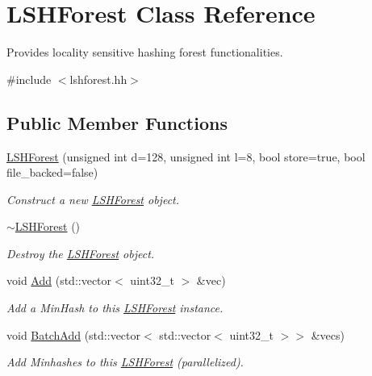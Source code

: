 \hypertarget{classLSHForest}{}\section{L\+S\+H\+Forest Class Reference}
\label{classLSHForest}


Provides locality sensitive hashing forest functionalities.  




{\ttfamily \#include $<$lshforest.\+hh$>$}

\subsection*{Public Member Functions}
\begin{DoxyCompactItemize}
\item 
\hyperlink{classLSHForest_ae227bb302c173481a129335fa581fa6f}{L\+S\+H\+Forest} (unsigned int d=128, unsigned int l=8, bool store=true, bool file\+\_\+backed=false)
\begin{DoxyCompactList}\small\item\em Construct a new \hyperlink{classLSHForest}{L\+S\+H\+Forest} object. \end{DoxyCompactList}\item 
\mbox{\label{classLSHForest_ac2e048b53de7268b2b16da47b99a3955}} 
\hyperlink{classLSHForest_ac2e048b53de7268b2b16da47b99a3955}{$\sim$\+L\+S\+H\+Forest} ()
\begin{DoxyCompactList}\small\item\em Destroy the \hyperlink{classLSHForest}{L\+S\+H\+Forest} object. \end{DoxyCompactList}\item 
void \hyperlink{classLSHForest_a000536ff09a94df528a1f72ffa40bac3}{Add} (std\+::vector$<$ uint32\+\_\+t $>$ \&vec)
\begin{DoxyCompactList}\small\item\em Add a Min\+Hash to this \hyperlink{classLSHForest}{L\+S\+H\+Forest} instance. \end{DoxyCompactList}\item 
void \hyperlink{classLSHForest_a668dc958bfc4856f26a96a4aa0897e53}{Batch\+Add} (std\+::vector$<$ std\+::vector$<$ uint32\+\_\+t $>$$>$ \&vecs)
\begin{DoxyCompactList}\small\item\em Add Minhashes to this \hyperlink{classLSHForest}{L\+S\+H\+Forest} (parallelized). \end{DoxyCompactList}\item 
$$
\end{DoxyCompactItemize}
